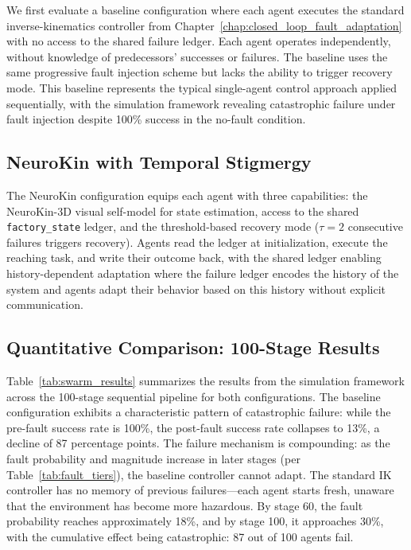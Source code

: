 \documentclass[12pt,a4paper,oneside]{report}
\begin{document}
We first evaluate a baseline configuration where each agent executes the standard inverse-kinematics controller from Chapter~\ref{chap:closed_loop_fault_adaptation} with no access to the shared failure ledger. Each agent operates independently, without knowledge of predecessors' successes or failures. The baseline uses the same progressive fault injection scheme but lacks the ability to trigger recovery mode. This baseline represents the typical single-agent control approach applied sequentially, with the simulation framework revealing catastrophic failure under fault injection despite 100\% success in the no-fault condition.

\subsection{NeuroKin with Temporal Stigmergy}
\label{subsec:neurokin_with_temporal_stigmergy}

The NeuroKin configuration equips each agent with three capabilities: the NeuroKin-3D visual self-model for state estimation, access to the shared \texttt{factory\_state} ledger, and the threshold-based recovery mode ($\tau = 2$ consecutive failures triggers recovery). Agents read the ledger at initialization, execute the reaching task, and write their outcome back, with the shared ledger enabling history-dependent adaptation where the failure ledger encodes the history of the system and agents adapt their behavior based on this history without explicit communication.

\subsection{Quantitative Comparison: 100-Stage Results}
\label{subsec:quantitative_comparison_100_stage_results}

Table~\ref{tab:swarm_results} summarizes the results from the simulation framework across the 100-stage sequential pipeline for both configurations. The baseline configuration exhibits a characteristic pattern of catastrophic failure: while the pre-fault success rate is 100\%, the post-fault success rate collapses to 13\%, a decline of 87 percentage points. The failure mechanism is compounding: as the fault probability and magnitude increase in later stages (per Table~\ref{tab:fault_tiers}), the baseline controller cannot adapt. The standard IK controller has no memory of previous failures—each agent starts fresh, unaware that the environment has become more hazardous. By stage 60, the fault probability reaches approximately 18\%, and by stage 100, it approaches 30\%, with the cumulative effect being catastrophic: 87 out of 100 agents fail.
\end{document}
